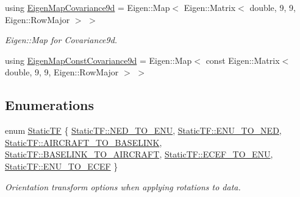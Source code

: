 \begin{DoxyCompactItemize}
\item 
using \mbox{\hyperlink{group__nodelib_ga69e67d58da05f220a6e938fdccdf5a07}{Eigen\+Map\+Covariance9d}} = Eigen\+::\+Map$<$ Eigen\+::\+Matrix$<$ double, 9, 9, Eigen\+::\+Row\+Major $>$ $>$
\begin{DoxyCompactList}\small\item\em Eigen\+::\+Map for Covariance9d. \end{DoxyCompactList}\item 
using \mbox{\hyperlink{group__nodelib_ga74be5c2cc6a60a7c17ab1286a1106643}{Eigen\+Map\+Const\+Covariance9d}} = Eigen\+::\+Map$<$ const Eigen\+::\+Matrix$<$ double, 9, 9, Eigen\+::\+Row\+Major $>$ $>$
\end{DoxyCompactItemize}
\subsection*{Enumerations}
\begin{DoxyCompactItemize}
\item 
enum \mbox{\hyperlink{group__nodelib_gacff0983128574bbbe115917b13e57a63}{Static\+TF}} \{ \newline
\mbox{\hyperlink{group__nodelib_ggacff0983128574bbbe115917b13e57a63a54ebbdd04042b8ac08b760aedb956d2c}{Static\+T\+F\+::\+N\+E\+D\+\_\+\+T\+O\+\_\+\+E\+NU}}, 
\mbox{\hyperlink{group__nodelib_ggacff0983128574bbbe115917b13e57a63ae769945757a52e40e0bdeffb65ef82c5}{Static\+T\+F\+::\+E\+N\+U\+\_\+\+T\+O\+\_\+\+N\+ED}}, 
\mbox{\hyperlink{group__nodelib_ggacff0983128574bbbe115917b13e57a63ab9e9881bc4e56047c35acaf00ba7a06a}{Static\+T\+F\+::\+A\+I\+R\+C\+R\+A\+F\+T\+\_\+\+T\+O\+\_\+\+B\+A\+S\+E\+L\+I\+NK}}, 
\mbox{\hyperlink{group__nodelib_ggacff0983128574bbbe115917b13e57a63ad6c3de7e2c38d9686e41a621ccfcfa86}{Static\+T\+F\+::\+B\+A\+S\+E\+L\+I\+N\+K\+\_\+\+T\+O\+\_\+\+A\+I\+R\+C\+R\+A\+FT}}, 
\newline
\mbox{\hyperlink{group__nodelib_ggacff0983128574bbbe115917b13e57a63ac0ec6eeec303cc411db7d439dbde623c}{Static\+T\+F\+::\+E\+C\+E\+F\+\_\+\+T\+O\+\_\+\+E\+NU}}, 
\mbox{\hyperlink{group__nodelib_ggacff0983128574bbbe115917b13e57a63a50787c17df83b45631e5bcd831ae1ee8}{Static\+T\+F\+::\+E\+N\+U\+\_\+\+T\+O\+\_\+\+E\+C\+EF}}
 \}
\begin{DoxyCompactList}\small\item\em Orientation transform options when applying rotations to data. \end{DoxyCompactList}\end{DoxyCompactItemize}
